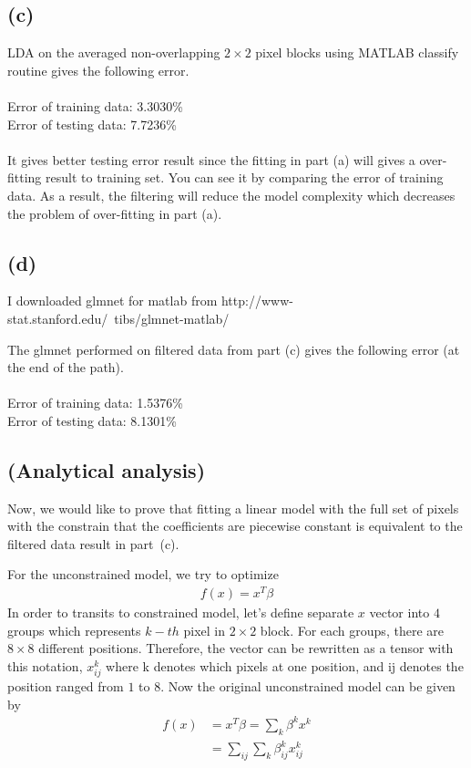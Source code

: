 \documentclass[pra,groupedaddress,amsmath,amssymb, column]{revtex4}
\begin{document}
\subsection*{(c)}
LDA on the averaged non-overlapping $2\times 2$ pixel blocks using MATLAB classify routine gives the following error.\\
\\
Error of training data: 3.3030\%\\
Error of testing data: 7.7236\%
\\
\\
It gives better testing error result since the fitting in part (a) will gives a over-fitting result to training set. You can see it by comparing the error of training data. As a result, the filtering will reduce the model complexity which decreases the problem of over-fitting in part (a). 

\subsection*{(d)}
I downloaded glmnet for matlab from http://www-stat.stanford.edu/~tibs/glmnet-matlab/

The glmnet performed on filtered data from part (c) gives the following error (at the end of the path).\\
\\
Error of training data: 1.5376\%\\
Error of testing data: 8.1301\%

\subsection*{(Analytical analysis)}
Now, we would like to prove that fitting a linear model with the full set of pixels with the constrain that the coefficients are piecewise constant is equivalent to the filtered data result in part~(c). 

For the unconstrained model, we try to optimize 
\begin{align}
f(x)=x^T\beta
\end{align}
In order to transits to constrained model, let's define separate $x$ vector into $4$ groups which represents $k-th$ pixel in $2\times 2$ block. For each groups, there are $8 \times 8$ different positions. Therefore, the vector can be rewritten as a tensor with this notation, $x^k_{ij}$ where k denotes which pixels at one position, and {ij} denotes the position ranged from $1$ to $8$. Now the original unconstrained model can be given by
\begin{align}
f(x)&=x^T\beta = \sum_k \beta^k x^k\\
&= \sum_{ij}\sum_k \beta^k_{ij} x^k_{ij}
\end{align}
\end{document}
